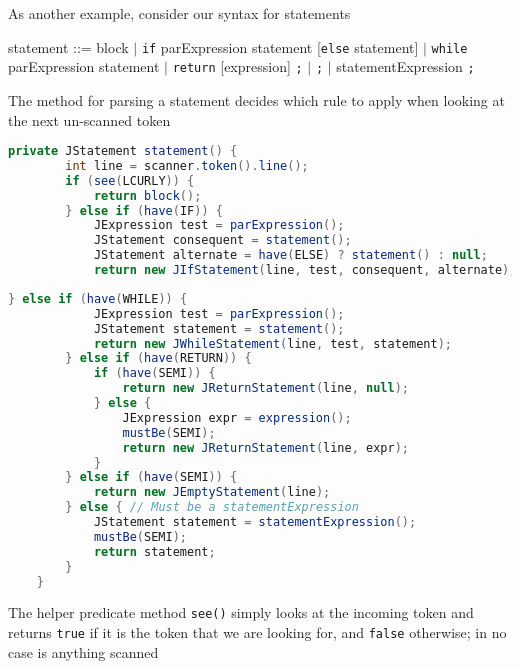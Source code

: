 \documentclass[8pt,a4paper,compress,handout]{beamer}
\newcommand{\mm}[1]{$#1$}
\newenvironment{spaced}
{
\smallskip
\hspace{.5cm}
\begin{minipage}[c]{\textwidth}
}
{
\end{minipage}
\smallskip
}
\begin{document}
\begin{frame}[fragile]
\pause

As another example, consider our syntax for statements

\text{ }
\begin{spaced}
\begin{production}
statement ::= block
                  \mm{|} \lstinline{if} parExpression statement [\lstinline{else} statement]
                  \mm{|} \lstinline{while} parExpression statement
                  \mm{|} \lstinline{return} [expression] \lstinline{;}
                  \mm{|} \lstinline{;}
                  \mm{|} statementExpression \lstinline{;}
\end{production}
\end{spaced}

\pause
\bigskip

The method for parsing a statement decides which rule to apply when looking at the next un-scanned token

\begin{lstlisting}[language=Java]
    private JStatement statement() {
        int line = scanner.token().line();
        if (see(LCURLY)) {
            return block();
        } else if (have(IF)) {
            JExpression test = parExpression();
            JStatement consequent = statement();
            JStatement alternate = have(ELSE) ? statement() : null;
            return new JIfStatement(line, test, consequent, alternate);
\end{lstlisting}
\end{frame}

\begin{frame}[fragile]
\pause

\begin{lstlisting}[language=Java]
        } else if (have(WHILE)) {
            JExpression test = parExpression();
            JStatement statement = statement();
            return new JWhileStatement(line, test, statement);
        } else if (have(RETURN)) {
            if (have(SEMI)) {
                return new JReturnStatement(line, null);
            } else {
                JExpression expr = expression();
                mustBe(SEMI);
                return new JReturnStatement(line, expr);
            }
        } else if (have(SEMI)) {
            return new JEmptyStatement(line);
        } else { // Must be a statementExpression
            JStatement statement = statementExpression();
            mustBe(SEMI);
            return statement;
        }
    }
\end{lstlisting}

\pause
\bigskip

The helper predicate method \lstinline{see()} simply looks at the incoming token and returns \lstinline{true} if it is the token that we are looking for, and \lstinline{false} otherwise; in no case is anything scanned
\end{frame}
\end{document}
